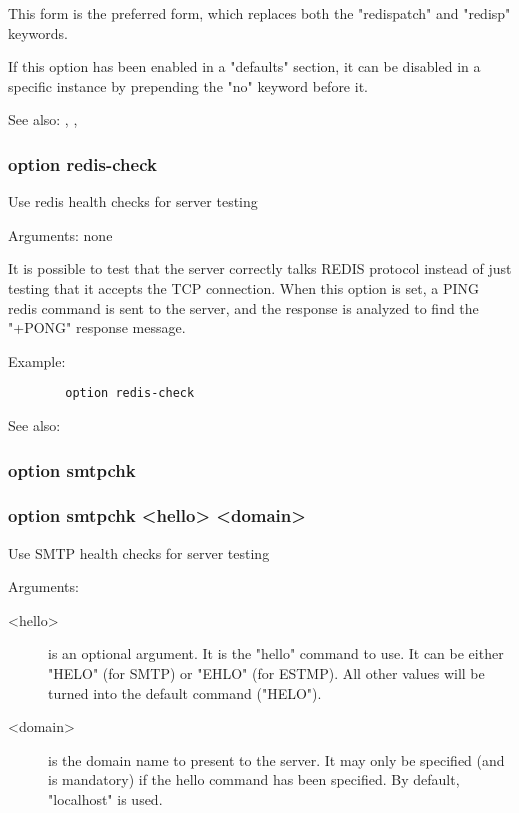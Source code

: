   This form is the preferred form, which replaces both the "redispatch" and
  "redisp" keywords.

  If this option has been enabled in a "defaults" section, it can be disabled
  in a specific instance by prepending the "no" keyword before it.

  See also: , , 

\subsubsection{option redis-check}


  Use redis health checks for server testing


  Arguments: none

  It is possible to test that the server correctly talks REDIS protocol instead
  of just testing that it accepts the TCP connection. When this option is set,
  a PING redis command is sent to the server, and the response is analyzed to
  find the "+PONG" response message.

  Example:
\begin{verbatim}
        option redis-check
\end{verbatim}

  See also: 

\subsubsection[option smtpchk]{option smtpchk}
\subsubsection*{option smtpchk <hello> <domain>}


  Use SMTP health checks for server testing


  Arguments:
  
\begin{description}
\item[<hello>]   is an optional argument. It is the "hello" command to use. It can
              be either "HELO" (for SMTP) or "EHLO" (for ESTMP). All other
              values will be turned into the default command ("HELO").

\item[<domain>] is the domain name to present to the server. It may only be
              specified (and is mandatory) if the hello command has been
              specified. By default, "localhost" is used.
\end{description}

